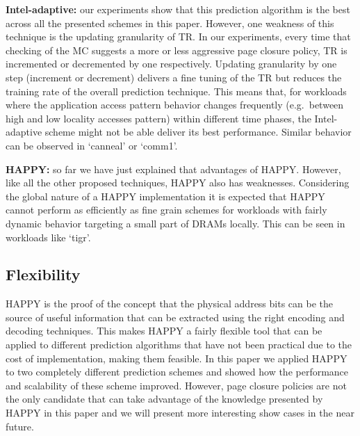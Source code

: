 {\bf Intel-adaptive:} our experiments show that this prediction algorithm is the best across all the presented schemes in this paper. However, one weakness of this technique is the updating granularity of TR. In our experiments, every time that checking of the MC suggests a more or less aggressive page closure policy, TR is incremented or decremented by one respectively.  Updating granularity by one step (increment or decrement) delivers a fine tuning of the TR but reduces the training rate of the overall prediction technique. This means that, for workloads where the application access pattern behavior changes frequently (e.g.\ between high and low locality accesses pattern) within different time phases, the Intel-adaptive scheme might not be able deliver its best performance.  Similar behavior can be observed in `canneal' or `comm1'.

{\bf HAPPY:} so far we have just explained that advantages of HAPPY. However, like all the other proposed techniques, HAPPY also has weaknesses. Considering the global nature of a HAPPY implementation it is expected that HAPPY cannot perform as efficiently as fine grain schemes for workloads with fairly dynamic behavior targeting a small part of DRAMs locally. This can be seen in workloads like `tigr'.


\subsection{Flexibility}

HAPPY is the proof of the concept that the physical address bits can be the source of useful information that can be extracted using the right encoding and decoding techniques. This makes HAPPY a fairly flexible tool that can be applied to different prediction algorithms that have not been practical due to the cost of implementation, making them feasible. In this paper we applied HAPPY to two completely different prediction schemes and showed how the performance and scalability of these scheme improved. However, page closure policies are not the only candidate that can take advantage of the knowledge presented by HAPPY in this paper and we will present more interesting show cases in the near future.

